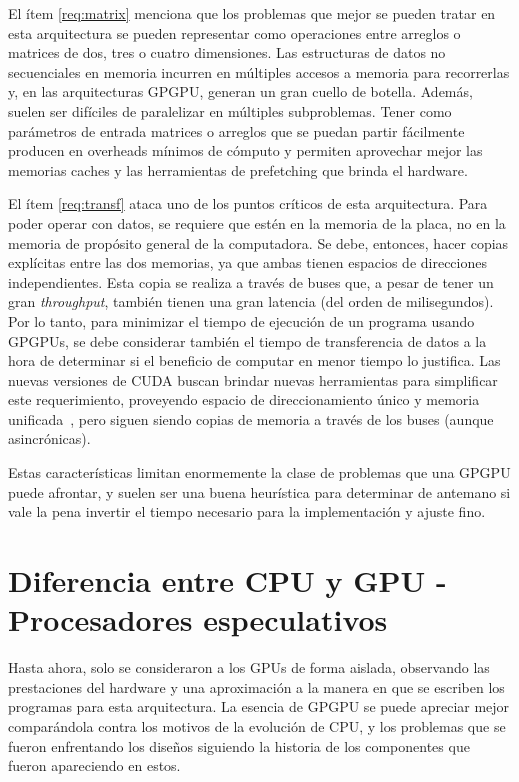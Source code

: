El ítem \ref{req:matrix} menciona que los problemas que mejor se pueden tratar en esta arquitectura se pueden representar como operaciones entre arreglos o matrices de dos, tres o cuatro dimensiones.
Las estructuras de datos no secuenciales en memoria incurren en m\'ultiples accesos a memoria para recorrerlas y, en las arquitecturas GPGPU, generan un gran cuello de botella.
Adem\'as, suelen ser dif\'iciles de paralelizar en m\'ultiples subproblemas.
Tener como par\'ametros de entrada matrices o arreglos que se puedan partir f\'acilmente producen en overheads m\'inimos de c\'omputo y permiten aprovechar mejor las memorias caches y las herramientas de prefetching que brinda el hardware.

El \'item \ref{req:transf} ataca uno de los puntos cr\'iticos de esta arquitectura.
Para poder operar con datos, se requiere que est\'en en la memoria de la placa, no en la memoria de prop\'osito general de la computadora.
Se debe, entonces, hacer copias expl\'icitas entre las dos memorias, ya que ambas tienen espacios de direcciones independientes.
Esta copia se realiza a trav\'es de buses que, a pesar de tener un gran \emph{throughput}, tambi\'en tienen una gran latencia (del orden de milisegundos).
Por lo tanto, para minimizar el tiempo de ejecuci\'on de un programa usando GPGPUs, se debe considerar tambi\'en el tiempo de transferencia de datos a la hora de determinar si el beneficio de computar en menor tiempo lo justifica.
Las nuevas versiones de CUDA buscan brindar nuevas herramientas para simplificar este requerimiento, proveyendo espacio de direccionamiento \'unico y memoria unificada~\cite{farberCuda}, pero siguen siendo copias de memoria a trav\'es de los buses (aunque asincr\'onicas).

Estas caracter\'isticas limitan enormemente la clase de problemas que una GPGPU puede afrontar, y suelen ser una buena heur\'istica para determinar de antemano si vale la pena
invertir el tiempo necesario para la implementaci\'on y ajuste fino.

\section{Diferencia entre CPU y GPU - Procesadores especulativos}

Hasta ahora, solo se consideraron a los GPUs de forma aislada, observando las prestaciones del hardware y una aproximaci\'on a la manera en que se escriben los programas para esta arquitectura.
La esencia de GPGPU se puede apreciar mejor compar\'andola contra los motivos de la evoluci\'on de CPU, y los problemas que se fueron enfrentando los dise\~nos siguiendo la historia de los componentes que fueron apareciendo en estos.

